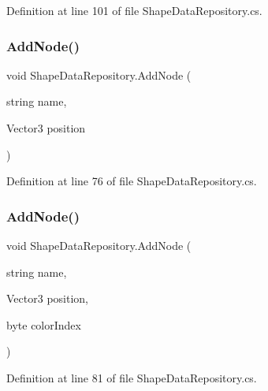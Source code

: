 Definition at line 101 of file Shape\+Data\+Repository.\+cs.

\mbox{\label{class_shape_data_repository_a00ae8e4c8c8a1269d14e829a308bf71c}} 
\subsubsection{\texorpdfstring{AddNode()}{AddNode()}\hspace{0.1cm}{\footnotesize\ttfamily [1/2]}}
{\footnotesize\ttfamily void Shape\+Data\+Repository.\+Add\+Node (\begin{DoxyParamCaption}\item[{string}]{name,  }\item[{Vector3}]{position }\end{DoxyParamCaption})}



Definition at line 76 of file Shape\+Data\+Repository.\+cs.

\mbox{\label{class_shape_data_repository_aec3bcbfd198c43b2f215a63f900f7738}} 
\subsubsection{\texorpdfstring{AddNode()}{AddNode()}\hspace{0.1cm}{\footnotesize\ttfamily [2/2]}}
{\footnotesize\ttfamily void Shape\+Data\+Repository.\+Add\+Node (\begin{DoxyParamCaption}\item[{string}]{name,  }\item[{Vector3}]{position,  }\item[{byte}]{color\+Index }\end{DoxyParamCaption})}



Definition at line 81 of file Shape\+Data\+Repository.\+cs.

\mbox{\label{class_shape_data_repository_afb3ac8b9a7e92031a07ca53b2be82bc7}} 
